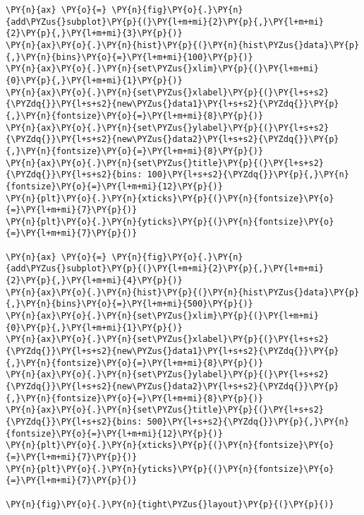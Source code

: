 \begin{tcolorbox}[breakable, size=fbox, boxrule=1pt, pad at break*=1mm,colback=cellbackground, colframe=cellborder]
\begin{Verbatim}[commandchars=\\\{\}]
\PY{n}{ax} \PY{o}{=} \PY{n}{fig}\PY{o}{.}\PY{n}{add\PYZus{}subplot}\PY{p}{(}\PY{l+m+mi}{2}\PY{p}{,}\PY{l+m+mi}{2}\PY{p}{,}\PY{l+m+mi}{3}\PY{p}{)}
\PY{n}{ax}\PY{o}{.}\PY{n}{hist}\PY{p}{(}\PY{n}{hist\PYZus{}data}\PY{p}{,}\PY{n}{bins}\PY{o}{=}\PY{l+m+mi}{100}\PY{p}{)}
\PY{n}{ax}\PY{o}{.}\PY{n}{set\PYZus{}xlim}\PY{p}{(}\PY{l+m+mi}{0}\PY{p}{,}\PY{l+m+mi}{1}\PY{p}{)}
\PY{n}{ax}\PY{o}{.}\PY{n}{set\PYZus{}xlabel}\PY{p}{(}\PY{l+s+s2}{\PYZdq{}}\PY{l+s+s2}{new\PYZus{}data1}\PY{l+s+s2}{\PYZdq{}}\PY{p}{,}\PY{n}{fontsize}\PY{o}{=}\PY{l+m+mi}{8}\PY{p}{)}
\PY{n}{ax}\PY{o}{.}\PY{n}{set\PYZus{}ylabel}\PY{p}{(}\PY{l+s+s2}{\PYZdq{}}\PY{l+s+s2}{new\PYZus{}data2}\PY{l+s+s2}{\PYZdq{}}\PY{p}{,}\PY{n}{fontsize}\PY{o}{=}\PY{l+m+mi}{8}\PY{p}{)}
\PY{n}{ax}\PY{o}{.}\PY{n}{set\PYZus{}title}\PY{p}{(}\PY{l+s+s2}{\PYZdq{}}\PY{l+s+s2}{bins: 100}\PY{l+s+s2}{\PYZdq{}}\PY{p}{,}\PY{n}{fontsize}\PY{o}{=}\PY{l+m+mi}{12}\PY{p}{)}
\PY{n}{plt}\PY{o}{.}\PY{n}{xticks}\PY{p}{(}\PY{n}{fontsize}\PY{o}{=}\PY{l+m+mi}{7}\PY{p}{)}
\PY{n}{plt}\PY{o}{.}\PY{n}{yticks}\PY{p}{(}\PY{n}{fontsize}\PY{o}{=}\PY{l+m+mi}{7}\PY{p}{)}

\PY{n}{ax} \PY{o}{=} \PY{n}{fig}\PY{o}{.}\PY{n}{add\PYZus{}subplot}\PY{p}{(}\PY{l+m+mi}{2}\PY{p}{,}\PY{l+m+mi}{2}\PY{p}{,}\PY{l+m+mi}{4}\PY{p}{)}
\PY{n}{ax}\PY{o}{.}\PY{n}{hist}\PY{p}{(}\PY{n}{hist\PYZus{}data}\PY{p}{,}\PY{n}{bins}\PY{o}{=}\PY{l+m+mi}{500}\PY{p}{)}
\PY{n}{ax}\PY{o}{.}\PY{n}{set\PYZus{}xlim}\PY{p}{(}\PY{l+m+mi}{0}\PY{p}{,}\PY{l+m+mi}{1}\PY{p}{)}
\PY{n}{ax}\PY{o}{.}\PY{n}{set\PYZus{}xlabel}\PY{p}{(}\PY{l+s+s2}{\PYZdq{}}\PY{l+s+s2}{new\PYZus{}data1}\PY{l+s+s2}{\PYZdq{}}\PY{p}{,}\PY{n}{fontsize}\PY{o}{=}\PY{l+m+mi}{8}\PY{p}{)}
\PY{n}{ax}\PY{o}{.}\PY{n}{set\PYZus{}ylabel}\PY{p}{(}\PY{l+s+s2}{\PYZdq{}}\PY{l+s+s2}{new\PYZus{}data2}\PY{l+s+s2}{\PYZdq{}}\PY{p}{,}\PY{n}{fontsize}\PY{o}{=}\PY{l+m+mi}{8}\PY{p}{)}
\PY{n}{ax}\PY{o}{.}\PY{n}{set\PYZus{}title}\PY{p}{(}\PY{l+s+s2}{\PYZdq{}}\PY{l+s+s2}{bins: 500}\PY{l+s+s2}{\PYZdq{}}\PY{p}{,}\PY{n}{fontsize}\PY{o}{=}\PY{l+m+mi}{12}\PY{p}{)}
\PY{n}{plt}\PY{o}{.}\PY{n}{xticks}\PY{p}{(}\PY{n}{fontsize}\PY{o}{=}\PY{l+m+mi}{7}\PY{p}{)}
\PY{n}{plt}\PY{o}{.}\PY{n}{yticks}\PY{p}{(}\PY{n}{fontsize}\PY{o}{=}\PY{l+m+mi}{7}\PY{p}{)}

\PY{n}{fig}\PY{o}{.}\PY{n}{tight\PYZus{}layout}\PY{p}{(}\PY{p}{)}
\end{Verbatim}
\end{tcolorbox}

    \begin{center}
    \end{center}
    { \hspace*{\fill} \\}
    
